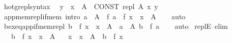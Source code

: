 \begin{isabellebody}
\isamarkupfalse%
\isanewline
{}\isamarkupfalse%
\ hotg{\isacharunderscore}{\kern0pt}repl{\isacharunderscore}{\kern0pt}syntax\isanewline
\isanewline
{}\isamarkupfalse%
\isanewline
\ \ {\isachardoublequoteopen}{\isacharbraceleft}{\kern0pt}y\ {\isacharbar}{\kern0pt}\ x\ {\isasymin}\ A{\isacharbraceright}{\kern0pt}{\isachardoublequoteclose}\ {\isasymrightleftharpoons}\ {\isachardoublequoteopen}CONST\ repl\ A\ {\isacharparenleft}{\kern0pt}{\isasymlambda}x{\isachardot}{\kern0pt}\ y{\isacharparenright}{\kern0pt}{\isachardoublequoteclose}\isanewline
\isanewline
{}\isamarkupfalse%
\ app{\isacharunderscore}{\kern0pt}mem{\isacharunderscore}{\kern0pt}repl{\isacharunderscore}{\kern0pt}if{\isacharunderscore}{\kern0pt}mem\ {\isacharbrackleft}{\kern0pt}intro{\isacharbrackright}{\kern0pt}{\isacharcolon}{\kern0pt}\ {\isachardoublequoteopen}a\ {\isasymin}\ A\ {\isasymLongrightarrow}\ f\ a\ {\isasymin}\ {\isacharbraceleft}{\kern0pt}f\ x\ {\isacharbar}{\kern0pt}\ x\ {\isasymin}\ A{\isacharbraceright}{\kern0pt}{\isachardoublequoteclose}\isanewline
%
\isadelimproof
\ \ %
\endisadelimproof
%
\isatagproof
{}\isamarkupfalse%
\ auto%
\endisatagproof
{\isafoldproof}%
%
\isadelimproof
\isanewline
%
\endisadelimproof
\isanewline
{}\isamarkupfalse%
\ bex{\isacharunderscore}{\kern0pt}eq{\isacharunderscore}{\kern0pt}app{\isacharunderscore}{\kern0pt}if{\isacharunderscore}{\kern0pt}mem{\isacharunderscore}{\kern0pt}repl{\isacharcolon}{\kern0pt}\ {\isachardoublequoteopen}b\ {\isasymin}\ {\isacharbraceleft}{\kern0pt}f\ x\ {\isacharbar}{\kern0pt}\ x\ {\isasymin}\ A{\isacharbraceright}{\kern0pt}\ {\isasymLongrightarrow}\ {\isasymexists}a\ {\isasymin}\ A{\isachardot}{\kern0pt}\ b\ {\isacharequal}{\kern0pt}\ f\ a{\isachardoublequoteclose}\isanewline
%
\isadelimproof
\ \ %
\endisadelimproof
%
\isatagproof
{}\isamarkupfalse%
\ auto%
\endisatagproof
{\isafoldproof}%
%
\isadelimproof
\isanewline
%
\endisadelimproof
\isanewline
{}\isamarkupfalse%
\ replE\ {\isacharbrackleft}{\kern0pt}elim{\isacharbang}{\kern0pt}{\isacharbrackright}{\kern0pt}{\isacharcolon}{\kern0pt}\isanewline
\ \ \ {\isachardoublequoteopen}b\ {\isasymin}\ {\isacharbraceleft}{\kern0pt}f\ x\ {\isacharbar}{\kern0pt}\ x\ {\isasymin}\ A{\isacharbraceright}{\kern0pt}{\isachardoublequoteclose}\isanewline
\ \ \ x\ \ {\isachardoublequoteopen}x\ {\isasymin}\ A{\isachardoublequoteclose}\ \ {\isachardoublequoteopen}b\ {\isacharequal}{\kern0pt}\ f\ x{\isachardoublequoteclose}\isanewline

\end{isabellebody}
